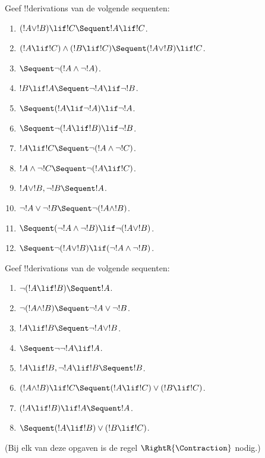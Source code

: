 \documentclass[openany]{memoir}
\begin{document}
\begin{prob}
Geef !!{derivation}s van de volgende sequenten:
\begin{enumerate}
\item $(!A \lor !B) \lif !C \Sequent !A \lif !C$.
\item $(!A \lif !C) \land (!B \lif !C) \Sequent (!A \lor !B) \lif !C$.
\item $\Sequent \lnot(!A \land \lnot !A)$.
\item $!B \lif !A \Sequent \lnot !A \lif \lnot !B$.
\item $\Sequent (!A \lif \lnot !A) \lif \lnot !A$.
\item $\Sequent \lnot(!A \lif !B) \lif \lnot !B$.
\item $!A \lif !C \Sequent \lnot (!A \land \lnot !C)$.
\item $!A \land \lnot !C \Sequent \lnot (!A \lif !C)$.
\item $!A \lor !B, \lnot !B \Sequent !A$.
\item $\lnot !A \lor \lnot !B \Sequent \lnot(!A \land !B)$.
\item $\Sequent (\lnot !A \land \lnot !B) \lif\lnot(!A \lor !B)$.
\item $\Sequent \lnot(!A \lor !B) \lif (\lnot !A \land \lnot !B)$.
\end{enumerate}
\end{prob}

\begin{prob}
Geef !!{derivation}s van de volgende sequenten:
\begin{enumerate}
\item $\lnot(!A \lif !B) \Sequent !A$.
\item $\lnot(!A \land !B) \Sequent \lnot !A \lor \lnot !B$.
\item $!A \lif !B \Sequent \lnot !A \lor !B$.
\item $\Sequent \lnot \lnot !A \lif !A$.
\item $!A \lif !B, \lnot !A \lif !B \Sequent !B$.
\item $(!A \land !B) \lif !C \Sequent (!A \lif !C) \lor (!B \lif !C)$.
\item $(!A \lif !B) \lif !A \Sequent !A$.
\item $\Sequent (!A \lif !B) \lor (!B \lif !C)$.
\end{enumerate}
(Bij elk van deze opgaven is de regel $\RightR{\Contraction}$ nodig.)
\end{prob}
\endgroup
\end{document}
